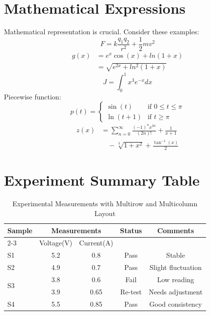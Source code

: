 \documentclass{article}
\begin{document}
\section{Mathematical Expressions}
Mathematical representation is crucial. Consider these examples:
\begin{equation}
    F=k\frac{q_1 q_2}{r^2}+\frac{1}{2}mv^2
\end{equation}
\begin{equation}
    \begin{split}
        g(x) &= e^x\cos(x) + ln(1+x) \\
             &= \sqrt{e^{2x}+ln^2(1+x)}
    \end{split}
\end{equation}
\begin{equation*}
    J=\int_{0}^{1}x^3e^{-x}dx
\end{equation*}
Piecewise function:
\begin{equation}
    p(t) = \begin{cases}
        \sin(t) & \text{if } 0 \le t \le \pi \\
        \ln(t+1) & \text{if } t \ge \pi
    \end{cases}
\end{equation}
\begin{equation}
    \begin{split}
        z(x) &= \sum_{n=0}^{\infty} \frac{(-1)^nx^{2n}}{(2n)!}+\frac{1}{x+1}\\
             &\quad - \sqrt[3]{1+x^2}+\frac{\tan^{-1}(x)}{2}
    \end{split}
\end{equation}
\clearpage
\section{Experiment Summary Table}
\begin{table}[H]
    \centering
    \vspace{0.2cm}
    \begin{tabular}{|l|c|c|c|c|}
        \hline
        \multirow{2}{*}{\textbf{Sample}} & \multicolumn{2}{|c|}{\textbf{Measurements}} & \multirow{2}{*}{\textbf{Status}} & \multirow{2}{*}{\textbf{Comments}} \\
        \cline{2-3} 
         & Voltage(V) & Current(A) & & \\ 
        \hline
        S1 & 5.2 & 0.8 & Pass & Stable \\ 
        \hline
        S2 & 4.9 & 0.7 & Pass & Slight fluctuation \\ 
        \hline
        \multirow{2}{*}{S3} & 3.8 & 0.6 & Fail & Low reading \\
         & 3.9 & 0.65 & Re-test & Needs adjustment \\ \hline
        S4 & 5.5 & 0.85 & Pass & Good consistency \\ \hline
    \end{tabular}
    \caption{Experimental Measurements with Multirow and Multicolumn Layout}
\end{table}
\end{document}
